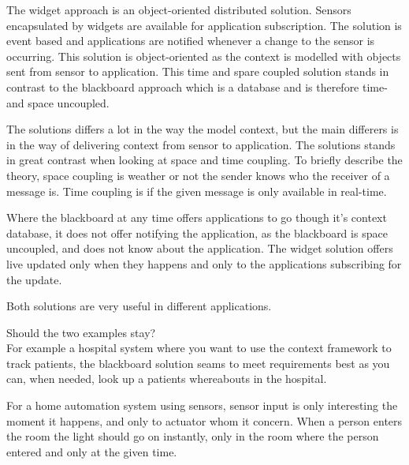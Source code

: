 \documentclass[../report.tex]{subfiles}
\begin{document}
The widget approach is an object-oriented distributed solution. Sensors encapsulated by widgets are available for application subscription. The solution is event based and applications are notified whenever a change to the sensor is occurring. This solution is object-oriented as the context is modelled with objects sent from sensor to application. This time and spare coupled solution stands in contrast to the blackboard approach which is a database and is therefore time- and space uncoupled.

The solutions differs a lot in the way the model context, but the main differers is in the way of delivering context from sensor to application. The solutions stands in great contrast when looking at space and time coupling. To briefly describe the theory, space coupling is weather or not the sender knows who the receiver of a message is. Time coupling is if the given message is only available in real-time. 

Where the blackboard at any time offers applications to go though it's context database, it does not offer notifying the application, as the blackboard is space uncoupled, and does not know about the application. The widget solution offers live updated only when they happens and only to the applications subscribing for the update.

Both solutions are very useful in different applications.

\todo Should the two examples stay?\\
For example a hospital system where you want to use the context framework to track patients, the blackboard solution seams to meet requirements best as you can, when needed, look up a patients whereabouts in the hospital.

For a home automation system using sensors, sensor input is only interesting the moment it happens, and only to actuator whom it concern. When a person enters the room the light should go on instantly, only in the room where the person entered and only at the given time. 
\end{document}
